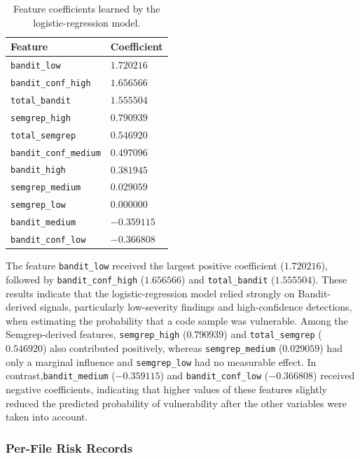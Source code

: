 \begin{table}[ht]
\centering
\small
\caption{Feature coefficients learned by the logistic-regression model.}
\label{tab:rq3-coefficients}
\begin{tabular}{|L{6.4cm}|C{3.5cm}|}
\hline
\textbf{Feature} & \textbf{Coefficient} \\
\hline
\texttt{bandit\_low} & $1.720216$ \\
\hline
\texttt{bandit\_conf\_high} & $1.656566$ \\
\hline
\texttt{total\_bandit} & $1.555504$ \\
\hline
\texttt{semgrep\_high} & $0.790939$ \\
\hline
\texttt{total\_semgrep} & $0.546920$ \\
\hline
\texttt{bandit\_conf\_medium} & $0.497096$ \\
\hline
\texttt{bandit\_high} & $0.381945$ \\
\hline
\texttt{semgrep\_medium} & $0.029059$ \\
\hline
\texttt{semgrep\_low} & $0.000000$ \\
\hline
\texttt{bandit\_medium} & $-0.359115$ \\
\hline
\texttt{bandit\_conf\_low} & $-0.366808$ \\
\hline
\end{tabular}
\end{table}

The feature \texttt{bandit\_low} received the largest positive coefficient ($1.720216$), followed by \texttt{bandit\_conf\_high} ($1.656566$) and \texttt{total\_bandit} ($1.555504$). These results indicate that the logistic-regression model relied strongly on Bandit-derived signals, particularly low-severity findings and high-confidence detections, when estimating the probability that a code sample was vulnerable. Among the Semgrep-derived features, \texttt{semgrep\_high} ($0.790939$) and \texttt{total\_semgrep} ($0.546920$) also contributed positively, whereas \texttt{semgrep\_medium} ($0.029059$) had only a marginal influence and \texttt{semgrep\_low} had no measurable effect. In contrast,\texttt{bandit\_medium} ($-0.359115$) and \texttt{bandit\_conf\_low} ($-0.366808$) received negative coefficients, indicating that higher values of these features slightly reduced the predicted probability of vulnerability after the other variables were taken into account.

\subsubsection{Per-File Risk Records}
\label{subsubsec:results-per-file}

